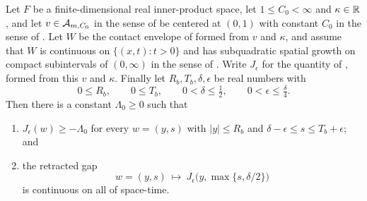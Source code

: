 \begin{lemma}
Let $F$ be a finite-dimensional real inner-product space, let $1\le C_0<\infty$
and $\kappa\in\mathbb{R}$, and let $v\in\mathcal{A}_{m,C_0}$ in the sense of
 be centered at $(0,1)$ with constant $C_0$ in the sense of
. Let $W$ be the contact envelope of 
formed from $v$ and $\kappa$, and assume that $W$ is continuous on
$\{(x,t):t>0\}$ and has subquadratic spatial growth on compact subintervals of
$(0,\infty)$ in the sense of . Write $J_\epsilon$
for the quantity of , formed from this $v$ and $\kappa$. Finally
let $R_b,T_b,\delta,\epsilon$ be real numbers with
\[
  0\le R_b,\qquad 0\le T_b,\qquad 0<\delta\le\tfrac12,\qquad
  0<\epsilon\le\tfrac\delta4 .
\]
Then there is a constant $\Lambda_0\ge0$ such that
\begin{enumerate}
\item[(i)] $J_\epsilon(w)\ge-\Lambda_0$ for every $w=(y,s)$ with $|y|\le R_b$
and $\delta-\epsilon\le s\le T_b+\epsilon$; and
\item[(ii)] the retracted gap
\[
  w=(y,s)\ \longmapsto\ J_\epsilon\bigl(y,\max\{s,\delta/2\}\bigr)
\]
is continuous on all of space-time.
\end{enumerate}
\end{lemma}
